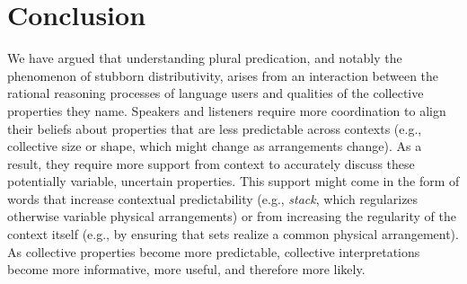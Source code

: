 \documentclass[preprint,12pt,authoryear,titlepage]{elsarticle}
\begin{document}




\section{Conclusion}

We have argued that understanding plural predication, and notably the phenomenon of stubborn distributivity, arises from an interaction between the rational reasoning processes of language users and qualities of the collective properties they name. Speakers and listeners require more coordination to align their beliefs about properties that are less predictable across contexts (e.g., collective size or shape, which might change as arrangements change). As a result, they require more support from context to accurately discuss these potentially variable, uncertain properties. This support might come in the form of words that increase contextual predictability (e.g., \emph{stack}, which regularizes otherwise variable physical arrangements) or from increasing the regularity of the context itself (e.g., by ensuring that sets realize a common physical arrangement). As collective properties become more predictable, collective interpretations become more informative, more useful, and therefore more likely.
\end{document}
